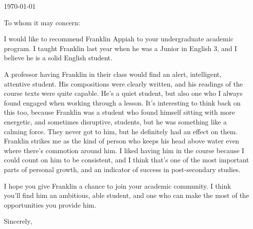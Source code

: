 \documentclass[11pt, letterpaper]{letter} %
\begin{document}

\begin{letter}{
	\today\\	
}


\opening{To whom it may concern:}

I would like to recommend Franklin Appiah to your undergraduate academic program. I taught Franklin last year when he was a Junior in English 3, and I believe he is a solid English student.

A professor having Franklin in their class would find an alert, intelligent, attentive student. His compositions were clearly written, and his readings of the course texts were quite capable. He's a quiet student, but also one who I always found engaged when working through a lesson. It's interesting to think back on this too, because Franklin was a student who found himself sitting with more energetic, and sometimes disruptive, students, but he was something like a calming force. They never got to him, but he definitely had an effect on them. Franklin strikes me as the kind of person who keeps his head above water even where there's commotion around him. I liked having him in the course because I could count on him to be consistent, and I think that's one of the most important parts of personal growth, and an indicator of success in post-secondary studies. 

I hope you give Franklin a chance to join your academic community. I think you'll find him an ambitious, able student, and one who can make the most of the opportunities you provide him.

\closing{Sincerely,}




\end{letter}
\end{document}
